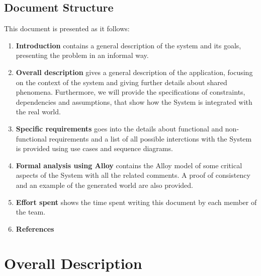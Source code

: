 \documentclass{report}
\begin{document}
\section{Document Structure}
This document is presented as it follows:
\begin{enumerate}
	\item {\textbf{Introduction}} contains a general description of the system and its goals, presenting the problem in an informal way.
	\item{\textbf{Overall description}} gives a general description of the application, focusing on the context of the system and giving further details about shared phenomena. Furthermore, we will provide the specifications of constraints, dependencies and assumptions, that show how the System is integrated with the real world.
	\item{\textbf{Specific requirements}} goes into the details about functional and non-functional requirements and a list of all possible interctions with the System is provided using use cases and sequence diagrams.
	\item {\textbf{Formal analysis using Alloy}} contains the Alloy model of some critical aspects of the System with all the related comments. A proof of consistency and an example of the generated world are also provided.
	\item {\textbf{Effort spent}} shows the time spent writing this document by each member of the team.
	\item {\textbf{References}}
\end{enumerate}

\chapter{Overall Description}
\end{document}
